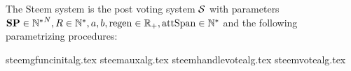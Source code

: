 \begin{definition}
  The Steem system is the post voting system $\mathcal{S}$ with parameters $\mathrm{\textbf{SP}}
  \in {\mathbb{N}^*}^N, R \in \mathbb{N}^*, a, b, \mathrm{regen} \in \mathbb{R}_{+},
  \mathrm{attSpan} \in \mathbb{N}^*$ and the following parametrizing procedures:
\end{definition}
{steemgfuncinitalg.tex}
{steemauxalg.tex}
{steemhandlevotealg.tex}
{steemvotealg.tex}
